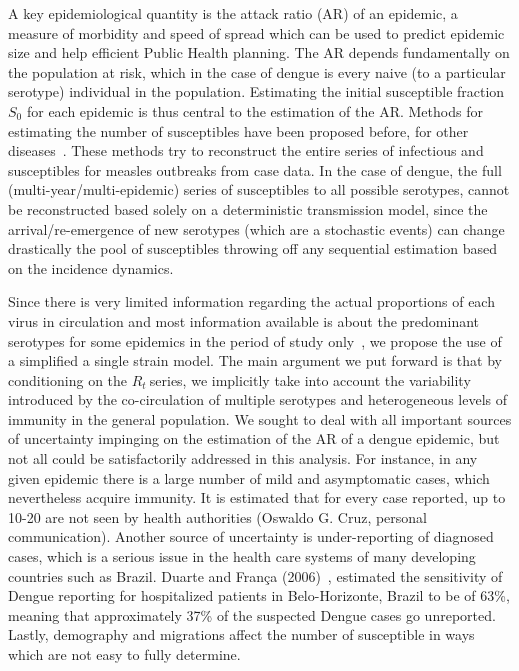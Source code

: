 \documentclass[10pt]{article}
\def \rr {$R_{t}\:$}
\begin{document}
A key epidemiological quantity is the attack ratio (AR) of an epidemic, a 
measure of morbidity and speed of spread which can be used to predict epidemic 
size and help efficient Public Health planning.
The AR depends fundamentally on the population at risk, which in the case of 
dengue is every naive (to a particular serotype) individual in the population.
Estimating the initial susceptible fraction $S_0$ for each epidemic is thus 
central to the estimation of the AR.
Methods for estimating the  number of susceptibles have been proposed 
before, for other diseases~\cite{bjornstad_dynamics_2002, 
wallinga_reconstruction_2003}.
These methods try to reconstruct the entire 
series of infectious and susceptibles for measles 
outbreaks from case data.
In the case of dengue, the full (multi-year/multi-epidemic)
series of susceptibles to all possible serotypes, cannot be reconstructed based 
solely on a deterministic transmission model, since the arrival/re-emergence of 
new serotypes (which are a stochastic events) can change drastically the pool 
of susceptibles throwing off any sequential estimation based on the incidence
dynamics.


Since there is very limited information regarding the actual proportions of 
each virus in circulation and most information available is about the 
predominant serotypes for some epidemics in the period of 
study only~\cite{macedo_virological_2013}, we propose the use of a 
simplified a single strain model.
The main argument we put forward is that by conditioning on the \rr series, we 
implicitly take into account the variability introduced by the 
co-circulation of multiple serotypes and heterogeneous levels of immunity in 
the general population.
We sought to deal with all important sources of uncertainty impinging on the 
estimation of the AR of a dengue epidemic, but not all could be satisfactorily 
addressed in this analysis.
For instance, in any given epidemic there is a large number of 
mild and asymptomatic cases, which nevertheless acquire immunity.
It is estimated that for every case reported, up to 10-20 are not seen by health 
authorities (Oswaldo G. Cruz, personal communication).
Another source of uncertainty is under-reporting of diagnosed cases, which is a 
serious issue in the health care systems of many developing countries such as 
Brazil. 
Duarte and Fran\c{c}a (2006)~\cite{duarte_data_2006}, estimated 
the sensitivity of Dengue reporting for hospitalized patients in 
Belo-Horizonte, Brazil to be of 63\%, meaning that approximately 37\% of the 
suspected Dengue cases go unreported.  
Lastly, demography and migrations affect the number of susceptible in ways 
which are not easy to fully determine.
\end{document}
